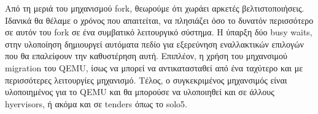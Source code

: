 Από τη μεριά του μηχανισμού fork, θεωρούμε ότι χωράει αρκετές βελτιστοποιήσεις.
Ιδανικά θα θέλαμε ο χρόνος που απαιτείται, να πλησιάζει όσο το δυνατόν
περισσότερο σε αυτόν του fork σε ένα συμβατικό λειτουργικό σύστημα. Η ύπαρξη δύο
busy waits, στην υλοποίηση δημιουργεί αυτόματα πεδίο για εξερεύνηση εναλλακτικών
επιλογών που θα επαλείφουν την καθυστέρηση αυτή. Επιπλέον, η χρήση του
μηχανσιμού migration του QEMU, ίσως να μπορεί να αντικατασταθεί από ένα ταχύτερο
και με περισσότερες λειτουργίες μηχανισμό. Τέλος, ο συγκεκριμένος μηχανσιμός
είναι υλοποιημένος για το QEMU και θα μπορούσε να υλοποιηθεί και σε άλλους
hyervisors, ή ακόμα και σε tenders όπως το solo5.


